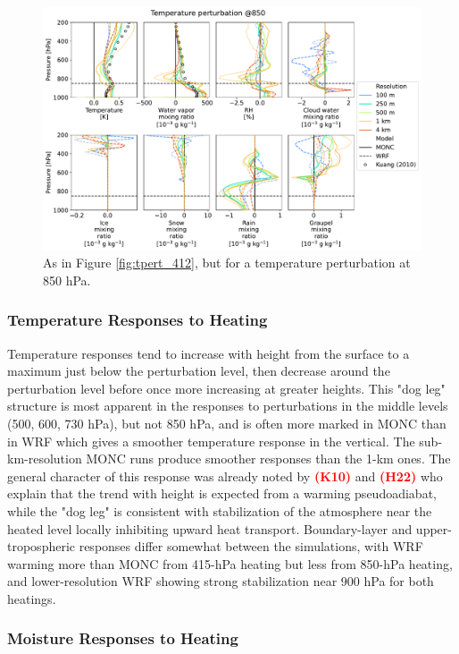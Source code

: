 \documentclass[draft]{agujournal2019}
\newcommand{\todo}[1]{\textcolor{red}{\textbf{(#1)}}}
\begin{document}
\begin{figure}[pth]
    \noindent\includegraphics[width=\textwidth]{figures/pert_diffs_T_0.5_@850}
    \caption{As in Figure \ref{fig:tpert_412}, but for a temperature
    perturbation at 850 hPa.}
    \label{fig:tpert_850}
\end{figure}

\subsubsection{Temperature Responses to Heating}

Temperature responses tend to
increase with height from the surface to a maximum just below the perturbation
level, then decrease around the perturbation level before once more increasing
at greater heights. This "dog leg" structure is most apparent in the responses to perturbations
in the middle levels (500, 600, 730 hPa), but not 850 hPa, and is often more marked in MONC than in WRF which gives a smoother
temperature response in the vertical. The sub-km-resolution MONC runs 
produce smoother responses than the 1-km ones. The general character of this response was already noted by \todo{K10} and \todo{H22} who explain that the trend with height is expected from a warming pseudoadiabat, while the "dog leg" is consistent with stabilization of the atmosphere near the heated level locally inhibiting upward heat transport. Boundary-layer and upper-tropospheric responses differ somewhat between the simulations, with WRF warming more than MONC from 415-hPa heating but less from 850-hPa heating, and lower-resolution WRF showing strong stabilization near 900 hPa for both heatings.

\subsubsection{Moisture Responses to Heating}
\end{document}
